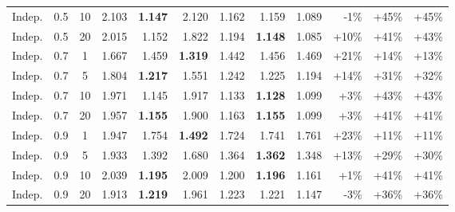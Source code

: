 \begin{table}[t]
\begin{tabular}{lcc | rrrrrr | rrr}
    Indep. & 0.5 & 10 & 2.103 & \textbf{1.147} & 2.120 & 1.162 & 1.159 & 1.089 & -1\% & +45\% & +45\% \\
    Indep. & 0.5 & 20 & 2.015 & 1.152 & 1.822 & 1.194 & \textbf{1.148} & 1.085 & +10\% & +41\% & +43\% \\
    Indep. & 0.7 & 1 & 1.667 & 1.459 & \textbf{1.319} & 1.442 & 1.456 & 1.469 & +21\% & +14\% & +13\% \\
    Indep. & 0.7 & 5 & 1.804 & \textbf{1.217} & 1.551 & 1.242 & 1.225 & 1.194 & +14\% & +31\% & +32\% \\
    Indep. & 0.7 & 10 & 1.971 & 1.145 & 1.917 & 1.133 & \textbf{1.128} & 1.099 & +3\% & +43\% & +43\% \\
    Indep. & 0.7 & 20 & 1.957 & \textbf{1.155} & 1.900 & 1.163 & \textbf{1.155} & 1.099 & +3\% & +41\% & +41\% \\
    Indep. & 0.9 & 1 & 1.947 & 1.754 & \textbf{1.492} & 1.724 & 1.741 & 1.761 & +23\% & +11\% & +11\% \\
    Indep. & 0.9 & 5 & 1.933 & 1.392 & 1.680 & 1.364 & \textbf{1.362} & 1.348 & +13\% & +29\% & +30\% \\
    Indep. & 0.9 & 10 & 2.039 & \textbf{1.195} & 2.009 & 1.200 & \textbf{1.196} & 1.161 & +1\% & +41\% & +41\% \\
    Indep. & 0.9 & 20 & 1.913 & \textbf{1.219} & 1.961 & 1.223 & 1.221 & 1.147 & -3\% & +36\% & +36\% \\
    \bottomrule
  \end{tabular}
\end{table}
